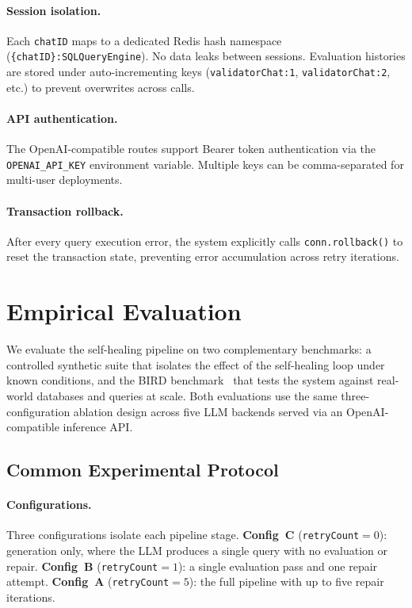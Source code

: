 \documentclass{article}
\begin{document}
\paragraph{Session isolation.} Each \texttt{chatID} maps to a dedicated Redis hash namespace (\texttt{\{chatID\}:SQLQueryEngine}). No data leaks between sessions. Evaluation histories are stored under auto-incrementing keys (\texttt{validatorChat:1}, \texttt{validatorChat:2}, etc.) to prevent overwrites across calls.

\paragraph{API authentication.} The OpenAI-compatible routes support Bearer token authentication via the \texttt{OPENAI\_API\_KEY} environment variable. Multiple keys can be comma-separated for multi-user deployments.

\paragraph{Transaction rollback.} After every query execution error, the system explicitly calls \texttt{conn.rollback()} to reset the transaction state, preventing error accumulation across retry iterations.


\section{Empirical Evaluation}
\label{sec:evaluation}

We evaluate the self-healing pipeline on two complementary benchmarks: a controlled synthetic suite that isolates the effect of the self-healing loop under known conditions, and the BIRD benchmark~\citep{li2024bird} that tests the system against real-world databases and queries at scale. Both evaluations use the same three-configuration ablation design across five LLM backends served via an OpenAI-compatible inference API.

\subsection{Common Experimental Protocol}

\paragraph{Configurations.} Three configurations isolate each pipeline stage. \textbf{Config~C} (\texttt{retryCount}${}=0$): generation only, where the LLM produces a single query with no evaluation or repair. \textbf{Config~B} (\texttt{retryCount}${}=1$): a single evaluation pass and one repair attempt. \textbf{Config~A} (\texttt{retryCount}${}=5$): the full pipeline with up to five repair iterations.
\end{document}
